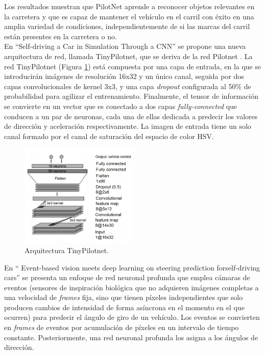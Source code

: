 Los resultados muestran que PilotNet aprende a reconocer objetos relevantes en la carretera y que es capaz de mantener el vehículo en el carril con éxito en una amplia variedad de condiciones, independientemente de si las marcas del carril están presentes en la carretera o no.\\


En ``Self-driving a Car in Simulation Through a CNN'' \cite{self-driving} se propone una nueva arquitectura de red, llamada TinyPilotnet, que se deriva de la red Pilotnet \cite{end2end} \cite{explaining-end2end}. La red TinyPilotnet (Figura \ref{fig.tinypilotnet}) está compuesta por una capa de entrada, en la que se introducirán imágenes de resolución 16x32 y un único canal, seguida por dos capas convolucionales de kernel 3x3, y una capa \textit{dropout} configurada al 50\% de probabilidad para agilizar el entrenamiento. Finalmente, el tensor de información se convierte en un vector que es conectado a dos capas \textit{fully-connected} que conducen a un par de neuronas, cada una de ellas dedicada a predecir los valores de dirección y aceleración respectivamente. La imagen de entrada tiene un solo canal formado por el canal de saturación del espacio de color HSV.\\

\begin{figure}
\begin{center}
	\includegraphics[width=0.5\textwidth]{figures/Estado_arte/tinypilotnet.png}
   \caption{Arquitectura TinyPilotnet.}
	\label{fig.tinypilotnet}
\end{center}
\end{figure}

En `` Event-based  vision  meets  deep  learning  on  steering  prediction  forself-driving  cars'' \cite{event} se presenta un enfoque de red neuronal profunda que emplea cámaras de eventos (sensores de inspiración biológica que no adquieren imágenes completas a una velocidad de \textit{frames} fija, sino que tienen píxeles independientes que solo producen cambios de intensidad de forma asíncrona en el momento en el que ocurren) para predecir el ángulo de giro de un vehículo. Los eventos se convierten en \textit{frames} de eventos por acumulación de píxeles en un intervalo de tiempo constante. Posteriormente, una red neuronal profunda los asigna a los ángulos de dirección.\\

